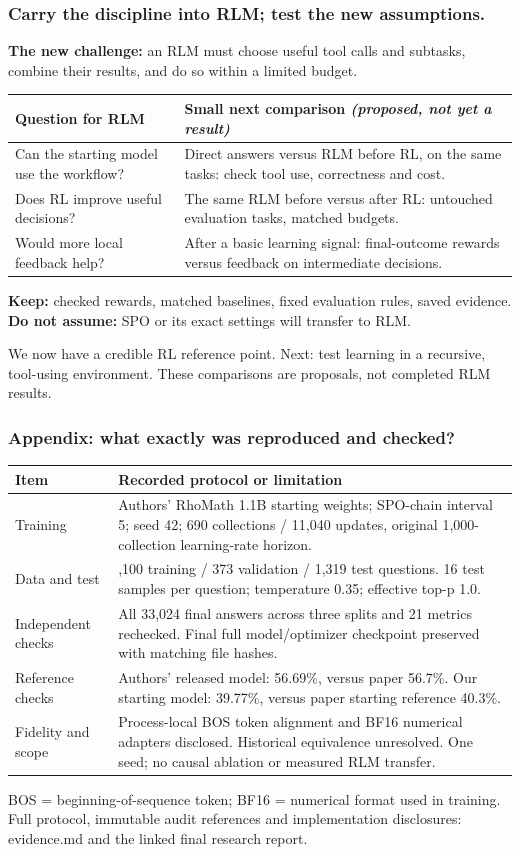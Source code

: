 \documentclass[aspectratio=169,11pt]{beamer}
\newcommand{\source}[1]{\vfill{\scriptsize\color{Gray}#1\par}}
\begin{document}
\begin{frame}[t]
\frametitle{Carry the discipline into RLM; test the new assumptions.}
\textbf{The new challenge:} an RLM must choose useful tool calls and subtasks,
combine their results, and do so within a limited budget.
\medskip
\begin{tabular}{@{}>{\raggedright\arraybackslash}p{}>{\raggedright\arraybackslash}p{}@{}}
\toprule
Question for RLM & Small next comparison \textit{(proposed, not yet a result)}\\
\midrule
Can the starting model use the workflow? &
Direct answers versus RLM before RL, on the same tasks:
check tool use, correctness and cost.\\[2mm]
Does RL improve useful decisions? &
The same RLM before versus after RL:
untouched evaluation tasks, matched budgets.\\[2mm]
Would more local feedback help? &
After a basic learning signal: final-outcome rewards
versus feedback on intermediate decisions.\\
\bottomrule
\end{tabular}
\medskip
\textbf{Keep:} checked rewards, matched baselines, fixed evaluation rules, saved evidence.\\
\textbf{Do not assume:} SPO or its exact settings will transfer to RLM.
\source{We now have a credible RL reference point. Next: test learning in a recursive, tool-using environment. These comparisons are proposals, not completed RLM results.}
\end{frame}

\appendix
\begin{frame}[t]
\frametitle{Appendix: what exactly was reproduced and checked?}
\small
\begin{tabular}{@{}>{\raggedright\arraybackslash}p{}>{\raggedright\arraybackslash}p{}@{}}
\toprule
Item & Recorded protocol or limitation\\
\midrule
Training &
Authors' RhoMath 1.1B starting weights; SPO-chain interval 5; seed 42;
690 collections / 11,040 updates, original 1,000-collection learning-rate horizon.\\[2mm]
Data and test &
7,100 training / 373 validation / 1,319 test questions.
16 test samples per question; temperature 0.35; effective top-p 1.0.\\[2mm]
Independent checks &
All 33,024 final answers across three splits and 21 metrics rechecked.
Final full model/optimizer checkpoint preserved with matching file hashes.\\[2mm]
Reference checks &
Authors' released model: 56.69\%, versus paper 56.7\%.
Our starting model: 39.77\%, versus paper starting reference 40.3\%.\\[2mm]
Fidelity and scope &
Process-local BOS token alignment and BF16 numerical adapters disclosed.
Historical equivalence unresolved. One seed; no causal
ablation or measured RLM transfer.\\
\bottomrule
\end{tabular}
\source{BOS = beginning-of-sequence token; BF16 = numerical format used in training. Full protocol, immutable audit references and implementation disclosures: evidence.md and the linked final research report.}
\end{frame}
\end{document}
